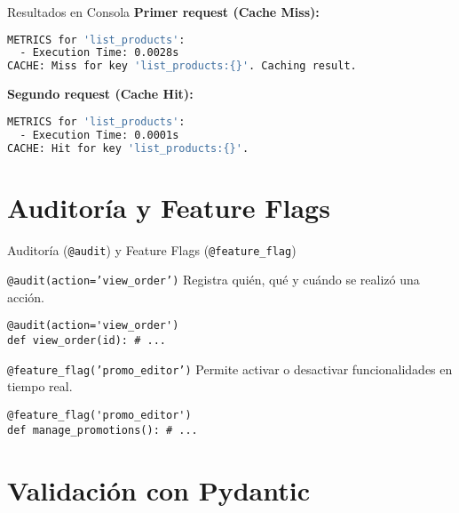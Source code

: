\documentclass[spanish]{beamer}
\begin{document}
\begin{frame}[fragile]{Resultados en Consola}
    \textbf{Primer request (Cache Miss):}
    \begin{lstlisting}[language=bash]
METRICS for 'list_products':
  - Execution Time: 0.0028s
CACHE: Miss for key 'list_products:{}'. Caching result.
    \end{lstlisting}
    
    \vfill
    
    \textbf{Segundo request (Cache Hit):}
    \begin{lstlisting}[language=bash]
METRICS for 'list_products':
  - Execution Time: 0.0001s
CACHE: Hit for key 'list_products:{}'.
    \end{lstlisting}
\end{frame}

\section{Auditoría y Feature Flags}

\begin{frame}[fragile]{Auditoría (\texttt{@audit}) y Feature Flags (\texttt{@feature\_flag})}
    \begin{block}{\texttt{@audit(action='view\_order')}}
        Registra quién, qué y cuándo se realizó una acción.
    \end{block}
    \begin{lstlisting}
@audit(action='view_order')
def view_order(id): # ...
    \end{lstlisting}

    \begin{block}{\texttt{@feature\_flag('promo\_editor')}}
        Permite activar o desactivar funcionalidades en tiempo real.
    \end{block}
    \begin{lstlisting}
@feature_flag('promo_editor')
def manage_promotions(): # ...
    \end{lstlisting}
\end{frame}

\section{Validación con Pydantic}
\end{document}
